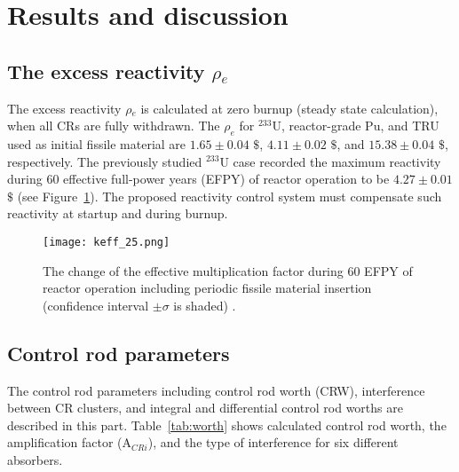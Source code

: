 \section{Results and discussion} \label{Results-and-discussion}

\subsection{The excess reactivity $\rho$$_e$}

The excess reactivity $\rho$$_e$ is calculated at zero burnup (steady state 
calculation), when all CRs are fully withdrawn. The $\rho_e$ for $^{233}$U, 
reactor-grade Pu, and TRU used as initial fissile material are $1.65\pm0.04$ 
$\$$, $4.11\pm0.02$ $\$$, and $15.38\pm0.04$ $\$$, respectively.
The previously studied $^{233}$U case recorded the maximum reactivity
during 60 effective full-power years (EFPY) of reactor operation to be 
$4.27\pm0.01$ $\$$ (see Figure~\ref{fig:keff_25}).
The proposed reactivity control system must compensate such reactivity at startup and during burnup.
\begin{figure}
	\centering
	\texttt{[image: keff\_25.png]}
	\vspace{-0.5in}
	\caption{The change of the effective multiplication factor during 60 EFPY of reactor operation including periodic fissile material insertion (confidence interval $\pm\sigma$ is shaded) \cite{ashraf2020whole}.} 
	\label{fig:keff_25}
\end{figure}

\subsection{Control rod parameters}

The control rod parameters including control rod worth (CRW), interference 
between CR clusters, and integral and differential control rod worths are 
described in this part. 
Table~\ref{tab:worth} shows calculated control rod worth, the amplification 
factor (A$_{CRi}$), and the type of interference for six different 
absorbers.

